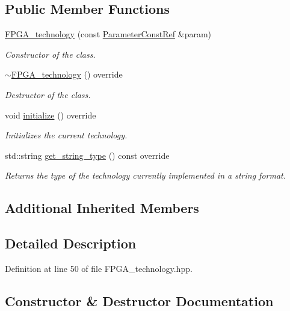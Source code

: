 \subsection*{Public Member Functions}
\begin{DoxyCompactItemize}
\item 
\hyperlink{classFPGA__technology_a1fecc7f78e4a1257cc091b07f134bddc}{F\+P\+G\+A\+\_\+technology} (const \hyperlink{Parameter_8hpp_a37841774a6fcb479b597fdf8955eb4ea}{Parameter\+Const\+Ref} \&param)
\begin{DoxyCompactList}\small\item\em Constructor of the class. \end{DoxyCompactList}\item 
\hyperlink{classFPGA__technology_a3d1ce24723204df9418d88cdb145f7bf}{$\sim$\+F\+P\+G\+A\+\_\+technology} () override
\begin{DoxyCompactList}\small\item\em Destructor of the class. \end{DoxyCompactList}\item 
void \hyperlink{classFPGA__technology_ae30c5de6f7aeb8b2e43d668a6c9ea774}{initialize} () override
\begin{DoxyCompactList}\small\item\em Initializes the current technology. \end{DoxyCompactList}\item 
std\+::string \hyperlink{classFPGA__technology_a991bb1b03178c5db7a77d008bfba2aa3}{get\+\_\+string\+\_\+type} () const override
\begin{DoxyCompactList}\small\item\em Returns the type of the technology currently implemented in a string format. \end{DoxyCompactList}\end{DoxyCompactItemize}
\subsection*{Additional Inherited Members}


\subsection{Detailed Description}


Definition at line 50 of file F\+P\+G\+A\+\_\+technology.\+hpp.



\subsection{Constructor \& Destructor Documentation}
\mbox{\label{classFPGA__technology_a1fecc7f78e4a1257cc091b07f134bddc}} 
